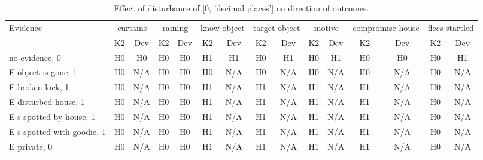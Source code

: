 \begin{table}\begin{tabular}{l|cc|cc|cc|cc|cc|cc|cc}\toprule\multirow{2}{*}{Evidence} & \multicolumn{2}{c}{curtains}& \multicolumn{2}{c}{raining}& \multicolumn{2}{c}{know object}& \multicolumn{2}{c}{target object}& \multicolumn{2}{c}{motive}& \multicolumn{2}{c}{compromise house}& \multicolumn{2}{c}{flees startled}\\& {K2} & {Dev}& {K2} & {Dev}& {K2} & {Dev}& {K2} & {Dev}& {K2} & {Dev}& {K2} & {Dev}& {K2} & {Dev}\\\midrule
no evidence, 0 & H0&H0&H0&H0&H1&H1&\cellcolor{Bittersweet}H0&\cellcolor{Bittersweet}H1&\cellcolor{Bittersweet}H0&\cellcolor{Bittersweet}H1&H0&H0&\cellcolor{Bittersweet}H0&\cellcolor{Bittersweet}H1\\E object is gone, 1 & \cellcolor{Bittersweet}H0&\cellcolor{Bittersweet}N/A&H0&H0&\cellcolor{Bittersweet}H0&\cellcolor{Bittersweet}N/A&\cellcolor{Bittersweet}H0&\cellcolor{Bittersweet}N/A&\cellcolor{Bittersweet}H0&\cellcolor{Bittersweet}N/A&\cellcolor{Bittersweet}H0&\cellcolor{Bittersweet}N/A&\cellcolor{Bittersweet}H0&\cellcolor{Bittersweet}N/A\\E broken lock, 1 & \cellcolor{Bittersweet}H0&\cellcolor{Bittersweet}N/A&H0&H0&\cellcolor{Bittersweet}H1&\cellcolor{Bittersweet}N/A&\cellcolor{Bittersweet}H1&\cellcolor{Bittersweet}N/A&\cellcolor{Bittersweet}H1&\cellcolor{Bittersweet}N/A&\cellcolor{Bittersweet}H1&\cellcolor{Bittersweet}N/A&\cellcolor{Bittersweet}H0&\cellcolor{Bittersweet}N/A\\E disturbed house, 1 & \cellcolor{Bittersweet}H0&\cellcolor{Bittersweet}N/A&H0&H0&\cellcolor{Bittersweet}H1&\cellcolor{Bittersweet}N/A&\cellcolor{Bittersweet}H1&\cellcolor{Bittersweet}N/A&\cellcolor{Bittersweet}H1&\cellcolor{Bittersweet}N/A&\cellcolor{Bittersweet}H1&\cellcolor{Bittersweet}N/A&\cellcolor{Bittersweet}H0&\cellcolor{Bittersweet}N/A\\E s spotted by house, 1 & \cellcolor{Bittersweet}H0&\cellcolor{Bittersweet}N/A&H0&H0&\cellcolor{Bittersweet}H1&\cellcolor{Bittersweet}N/A&\cellcolor{Bittersweet}H1&\cellcolor{Bittersweet}N/A&\cellcolor{Bittersweet}H1&\cellcolor{Bittersweet}N/A&\cellcolor{Bittersweet}H1&\cellcolor{Bittersweet}N/A&\cellcolor{Bittersweet}H0&\cellcolor{Bittersweet}N/A\\E s spotted with goodie, 1 & \cellcolor{Bittersweet}H0&\cellcolor{Bittersweet}N/A&H0&H0&\cellcolor{Bittersweet}H1&\cellcolor{Bittersweet}N/A&\cellcolor{Bittersweet}H1&\cellcolor{Bittersweet}N/A&\cellcolor{Bittersweet}H1&\cellcolor{Bittersweet}N/A&\cellcolor{Bittersweet}H1&\cellcolor{Bittersweet}N/A&\cellcolor{Bittersweet}H0&\cellcolor{Bittersweet}N/A\\E private, 0 & \cellcolor{Bittersweet}H0&\cellcolor{Bittersweet}N/A&H0&H0&\cellcolor{Bittersweet}H1&\cellcolor{Bittersweet}N/A&\cellcolor{Bittersweet}H1&\cellcolor{Bittersweet}N/A&\cellcolor{Bittersweet}H1&\cellcolor{Bittersweet}N/A&\cellcolor{Bittersweet}H1&\cellcolor{Bittersweet}N/A&\cellcolor{Bittersweet}H0&\cellcolor{Bittersweet}N/A\\\bottomrule\end{tabular}\caption{Effect of disturbance of [0, 'decimal places'] on direction of outcomes.}\end{table}